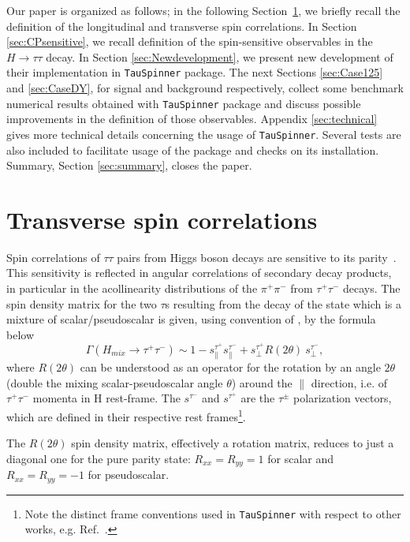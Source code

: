 \documentclass[12pt]{article}
\begin{document}
Our paper is organized as follows; in the following Section~\ref{sec:transverse},
we briefly recall the definition of the longitudinal and transverse spin correlations.
In  Section \ref{sec:CPsensitive},  we recall definition of the 
spin-sensitive observables in the $H \to \tau \tau$ decay.  In  Section \ref{sec:Newdevelopment}, we 
present new development of their implementation in  {\tt TauSpinner} package. The next 
Sections \ref{sec:Case125} and \ref{sec:CaseDY}, for signal and background respectively,
 collect some benchmark numerical results obtained with {\tt TauSpinner}
package and discuss possible improvements in the definition of those observables. 
Appendix \ref{sec:technical}  gives more technical details concerning the usage of  {\tt TauSpinner}. 
Several tests are also included to facilitate usage of the package and checks on its installation. 
Summary, Section \ref{sec:summary}, closes the paper.




\section {Transverse spin correlations }
\label{sec:transverse}

Spin correlations of $\tau \tau$ pairs from Higgs boson decays are sensitive to its parity~\cite{Nelson89}.
This sensitivity is reflected in angular correlations of secondary decay products, in particular in 
the acollinearity distributions of the $\pi^+ \pi^-$ from $\tau^+\tau^-$ decays. 
The spin density matrix for the two $\tau$s resulting from the decay of the state which is a mixture 
of scalar/pseudoscalar is given, using convention of \cite{Kramer:1994jn}, by the formula below
\begin{equation}  
\Gamma(H_{mix}\to \tau^{+}\tau^{-}) \sim 1-s^{\tau^{+}}_{\parallel}
s^{\tau^{-}}_{\parallel}+ s^{\tau^{+}}_{\perp}
R(2\theta)~s^{\tau^{-}}_{\perp},
\label{densi}  
\end{equation}   
where $R(2\theta)$ can be understood as  an operator for the rotation by
an angle $2\theta$ (double the mixing scalar-pseudoscalar angle $\theta$)   
around the ${\parallel}$ direction, i.e. of $\tau^+ \tau^-$ momenta in H rest-frame.  
The $s^{\tau^{-}}$ and $s^{\tau^{+}}$ are  the $\tau^\pm$ polarization
vectors, which are defined  in their respective rest frames\footnote{
Note the distinct frame conventions used in {\tt TauSpinner} with respect
to other works, e.g. Ref.~\cite{Desch:2003rw}.}.

The $R(2\theta)$ spin density matrix, effectively a rotation matrix,
reduces to just  a diagonal one for the pure parity state: $R_{xx}=R_{yy}=1$ 
for scalar and $R_{xx}=R_{yy}=-1$ for pseudoscalar.
\end{document}
